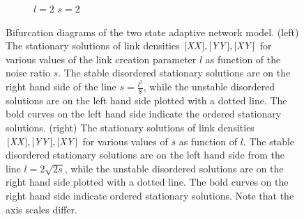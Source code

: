 \begin{figure}[htp]
	\ContinuedFloat
	\begin{subfigure}{\textwidth}
		\centering
		\caption{\qquad\qquad $l=2$ \hspace{4.8cm} $s=2$ \qquad\qquad\quad}
		\label{}
	\end{subfigure}
	\caption{Bifurcation diagrams of the two state adaptive network model. (left) The stationary solutions of link densities $\mathit{[XX]}, \mathit{[YY]}, \mathit{[XY]}$ for various values of the link creation parameter $l$ as function of the noise ratio $s$. The stable disordered stationary solutions are on the right hand side of the line $s=\frac{l^2}{8}$, while the unstable disordered solutions are on the left hand side plotted with a dotted line. The bold curves on the left hand side indicate the ordered stationary solutions. (right) The stationary solutions of link densities $\mathit{[XX]}, \mathit{[YY]}, \mathit{[XY]}$ for various values of $s$ as function of $l$. The stable disordered stationary solutions are on the left hand side from the line $l=2\sqrt{2s}$, while the unstable disordered solutions are on the right hand side plotted with a dotted line. The bold curves on the right hand side indicate ordered stationary solutions. Note that the axis scales differ. }
	\label{fig:bifurcation_firstM}
\end{figure}

